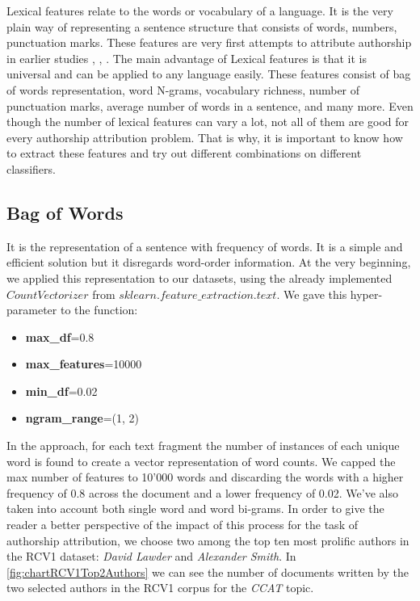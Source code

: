 Lexical features relate to the words or vocabulary of a language. It is the very plain way of representing a sentence structure that consists of words, numbers, punctuation marks. These features are very first attempts to attribute authorship in earlier studies \cite{fox2012statistical}, \cite{argamon2005measuring}, \cite{stanko2013whose}. The main advantage of Lexical features is that it is universal and can be applied to any language easily. These features consist of bag of words representation, word N-grams, vocabulary richness, number of punctuation marks, average number of words in a sentence, and many more. Even though the number of lexical features can vary a lot, not all of them are good for every authorship attribution problem. That is why, it is important to know how to extract these features and try out different combinations on different classifiers.

\subsection{Bag of Words}
It is the representation of a sentence with frequency of words. It is a simple and efficient solution but it disregards word-order information.
At the very beginning, we applied this representation to our datasets, using the already implemented $CountVectorizer$ from $sklearn.feature\_extraction.text$. We gave this hyper-parameter to the function:
\begin{itemize}
	\item \textbf{max\_df}=0.8
	\item \textbf{max\_features}=10000
	\item \textbf{min\_df}=0.02
	\item \textbf{ngram\_range}=(1, 2)
\end{itemize}
In the approach, for each text fragment the number of instances of each unique word is found to create a vector representation of word counts. We capped the max number of features to 10'000 words and discarding the words with a higher frequency of 0.8 across the document and a lower frequency of 0.02. We've also taken into account both single word and word bi-grams. In order to give the reader a better perspective of the impact of this process for the task of authorship attribution, we choose two among the top ten most prolific authors in the RCV1 dataset: \textit{David Lawder} and \textit{Alexander Smith}.
In \autoref{fig:chartRCV1Top2Authors} we can see the number of documents written by the two selected authors in the RCV1 corpus for the \textit{CCAT} topic.

